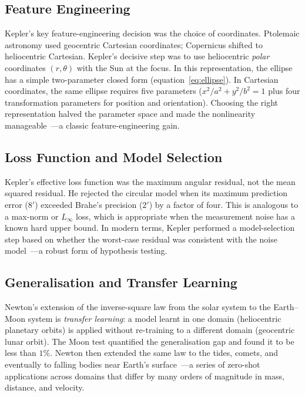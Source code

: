 \documentclass[12pt]{article}
\begin{document}
\subsection{Feature Engineering}

Kepler's key feature-engineering decision was the choice of coordinates.
Ptolemaic astronomy used geocentric Cartesian coordinates;
Copernicus shifted to heliocentric Cartesian.
Kepler's decisive step was to use heliocentric \emph{polar} coordinates
$(r,\theta)$ with the Sun at the focus.
In this representation, the ellipse has a simple two-parameter closed form
(equation~\eqref{eq:ellipse}).
In Cartesian coordinates, the same ellipse requires five parameters
($x^{2}/a^{2}+y^{2}/b^{2}=1$ plus four transformation parameters
for position and orientation).
Choosing the right representation halved the parameter space and made the
nonlinearity manageable~---a classic feature-engineering gain.

\subsection{Loss Function and Model Selection}

Kepler's effective loss function was the maximum angular residual, not the
mean squared residual.
He rejected the circular model when its maximum prediction error
($8'$) exceeded Brahe's precision ($2'$) by a factor of four.
This is analogous to a max-norm or $L_\infty$ loss, which is appropriate
when the measurement noise has a known hard upper bound.
In modern terms, Kepler performed a model-selection step based on whether
the worst-case residual was consistent with the noise model~---a robust
form of hypothesis testing.

\subsection{Generalisation and Transfer Learning}

Newton's extension of the inverse-square law from the solar system to
the Earth--Moon system is \emph{transfer learning}: a model learnt in one
domain (heliocentric planetary orbits) is applied without re-training to a
different domain (geocentric lunar orbit).
The Moon test quantified the generalisation gap and found it to be less
than $1\%$.
Newton then extended the same law to the tides, comets, and eventually to
falling bodies near Earth's surface~---a series of zero-shot applications
across domains that differ by many orders of magnitude in mass, distance,
and velocity.
\end{document}
